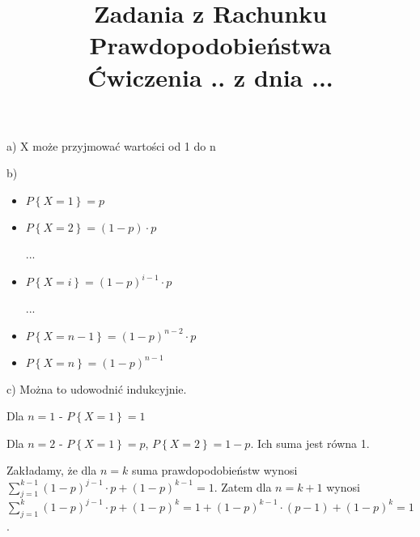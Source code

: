 \documentclass[fleqn]{article}
\begin{document}
\title{Zadania z Rachunku Prawdopodobieństwa \\ Ćwiczenia .. z dnia ...}
\date{}
\medskip
{}
\medskip

a) X może przyjmować wartości od 1 do n

b) \begin{itemize}
\item $P\left\lbrace X=1 \right\rbrace=p$
\item $P\left\lbrace X=2 \right\rbrace=\left(1-p\right)\cdot p$

...

\item $P\left\lbrace X=i \right\rbrace=\left(1-p\right)^{i-1}\cdot p$

...

\item $P\left\lbrace X=n-1 \right\rbrace=\left(1-p\right)^{n-2}\cdot p$
\item $P\left\lbrace X=n \right\rbrace=\left(1-p\right)^{n-1}$
\end{itemize}
c) Można to udowodnić indukcyjnie. 

Dla $n=1$ - $P\left\lbrace X=1 \right\rbrace=1$ 

Dla $n=2$ - $P\left\lbrace X=1 \right\rbrace=p$, $P\left\lbrace X=2 \right\rbrace=1-p$. Ich suma jest równa 1.

Zakładamy, że dla $n=k$ suma prawdopodobieństw wynosi $\sum\limits_{j=1}^{k-1}\left(1-p\right)^{j-1}\cdot p+\left(1-p\right)^{k-1}=1$.
Zatem dla $n=k+1$ wynosi $\sum\limits_{j=1}^{k}\left(1-p\right)^{j-1}\cdot p+\left(1-p\right)^{k}=1+\left(1-p\right)^{k-1}\cdot \left( p-1\right)+\left(1-p\right)^{k}=1$. 
\end{document}
